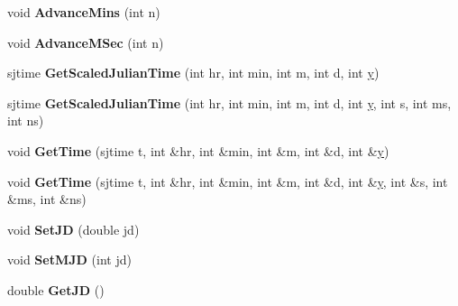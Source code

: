 \begin{DoxyCompactItemize}
\item 
\hypertarget{classmint_1_1_time_a4a1649651614262a58a135d36dcdd09b}{void {\bfseries Advance\+Mins} (int n)}\label{classmint_1_1_time_a4a1649651614262a58a135d36dcdd09b}

\item 
\hypertarget{classmint_1_1_time_ab15ff9d27cfdd22637c12489fb204991}{void {\bfseries Advance\+M\+Sec} (int n)}\label{classmint_1_1_time_ab15ff9d27cfdd22637c12489fb204991}

\item 
\hypertarget{classmint_1_1_time_ad32db4cde85748f0c4ae307e9910e70d}{sjtime {\bfseries Get\+Scaled\+Julian\+Time} (int hr, int min, int m, int d, int \hyperlink{_ice_utils_8h_aa7ffaed69623192258fb8679569ff9ba}{y})}\label{classmint_1_1_time_ad32db4cde85748f0c4ae307e9910e70d}

\item 
\hypertarget{classmint_1_1_time_a4a631bddd3c0d4b09bd126513c3dff1f}{sjtime {\bfseries Get\+Scaled\+Julian\+Time} (int hr, int min, int m, int d, int \hyperlink{_ice_utils_8h_aa7ffaed69623192258fb8679569ff9ba}{y}, int s, int ms, int ns)}\label{classmint_1_1_time_a4a631bddd3c0d4b09bd126513c3dff1f}

\item 
\hypertarget{classmint_1_1_time_aa3e67ea338c8709e7ee119604e3b2813}{void {\bfseries Get\+Time} (sjtime t, int \&hr, int \&min, int \&m, int \&d, int \&\hyperlink{_ice_utils_8h_aa7ffaed69623192258fb8679569ff9ba}{y})}\label{classmint_1_1_time_aa3e67ea338c8709e7ee119604e3b2813}

\item 
\hypertarget{classmint_1_1_time_a6d2f52982f788a6d18b193df127db3d2}{void {\bfseries Get\+Time} (sjtime t, int \&hr, int \&min, int \&m, int \&d, int \&\hyperlink{_ice_utils_8h_aa7ffaed69623192258fb8679569ff9ba}{y}, int \&s, int \&ms, int \&ns)}\label{classmint_1_1_time_a6d2f52982f788a6d18b193df127db3d2}

\item 
\hypertarget{classmint_1_1_time_a97fe849fa968470cc314e191db0eb358}{void {\bfseries Set\+J\+D} (double jd)}\label{classmint_1_1_time_a97fe849fa968470cc314e191db0eb358}

\item 
\hypertarget{classmint_1_1_time_a896c4e751bda3ad7fa8bfdf366163672}{void {\bfseries Set\+M\+J\+D} (int jd)}\label{classmint_1_1_time_a896c4e751bda3ad7fa8bfdf366163672}

\item 
\hypertarget{classmint_1_1_time_a174a6a3563f74abc9684e6708b218312}{double {\bfseries Get\+J\+D} ()}\label{classmint_1_1_time_a174a6a3563f74abc9684e6708b218312}


\end{DoxyCompactItemize}
